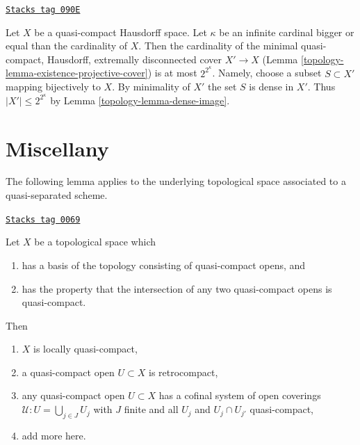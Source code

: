 \begin{remark}
\label{topology-remark-size-projective-cover}
\href{https://stacks.math.columbia.edu/tag/090E}{\texttt{Stacks tag 090E}}

Let $X$ be a quasi-compact Hausdorff space. Let $\kappa$ be an infinite
cardinal bigger or equal than the cardinality of $X$. Then the cardinality
of the minimal quasi-compact, Hausdorff, extremally disconnected cover
$X' \to X$ (Lemma \ref{topology-lemma-existence-projective-cover})
is at most $2^{2^\kappa}$. Namely, choose a subset $S \subset X'$
mapping bijectively to $X$. By minimality of $X'$ the set $S$ is dense
in $X'$. Thus $|X'| \leq 2^{2^\kappa}$ by Lemma \ref{topology-lemma-dense-image}.
\end{remark}

\section{Miscellany}
\label{topology-section-miscellany}
The following lemma applies to the underlying topological space
associated to a quasi-separated scheme.

\begin{lemma}
\label{topology-lemma-topology-quasi-separated-scheme}
\href{https://stacks.math.columbia.edu/tag/0069}{\texttt{Stacks tag 0069}}

Let $X$ be a topological space which
\begin{enumerate}
\item has a basis of the topology consisting of quasi-compact opens, and
\item has the property that the intersection of any two quasi-compact
opens is quasi-compact.
\end{enumerate}
Then
\begin{enumerate}
\item $X$ is locally quasi-compact,
\item a quasi-compact open $U \subset X$ is retrocompact,
\item any quasi-compact open $U \subset X$ has a cofinal system of open
coverings $\mathcal{U} : U = \bigcup_{j\in J} U_j$ with $J$ finite
and all $U_j$ and $U_j \cap U_{j'}$ quasi-compact,
\item add more here.
\end{enumerate}
\end{lemma}


